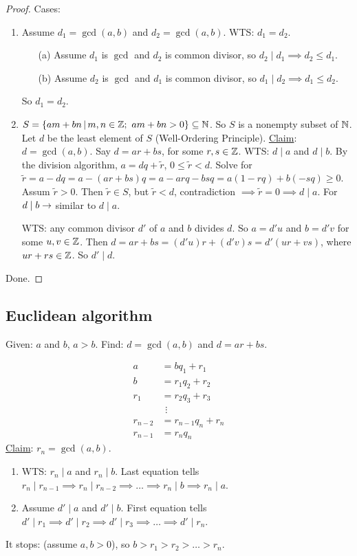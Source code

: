 \documentclass[]{article}
\begin{document}
\begin{proof}
	Cases:
	\begin{enumerate}
		\item Assume $d_1 = \gcd(a,b)$ and $d_2 = \gcd(a,b)$. WTS: $d_1 = d_2$.
		\begin{enumerate}
			\item[(a)] Assume $d_1$ is $\gcd$ and $d_2$ is common divisor, so $d_2\mid d_1 \implies d_2 \leq d_1$.
			\item[(b)] Assume $d_2$ is $\gcd$ and $d_1$ is common divisor, so $d_1\mid d_2 \implies d_1 \leq d_2$.
		\end{enumerate}
		So $d_1 = d_2$.
		
	\item $S = \setm{ am + bn}{m,n\in\mb Z;\ am+bn>0}\subseteq \mb N$. So $S$ is a nonempty subset of $\mathbb{N}$. Let $d$ be the least element of $S$ (Well-Ordering Principle). \ul{Claim}: $d = \gcd(a,b)$. Say $d = ar+bs$, for some $r,s\in\mathbb{Z}$. WTS: $d\mid a$ and $d\mid b$. By the division algorithm, $a = dq + \tilde{r}$, $0\leq \tilde{r}<d$. Solve for $\tilde{r} = a-dq = a-(ar+bs)q = a - arq - bsq = a(1-rq)+b(-sq) \geq 0$. Assum $\tilde r >0$. Then $\tilde r \in S$, but $\tilde r<d$, contradiction $\implies \tilde r = 0 \implies d\mid a$. For $d\mid b \rightarrow$ similar to $d\mid a$.
		
		WTS: any common divisor $d'$ of $a$ and $b$ divides $d$. So $a = d' u$ and $b = d' v$ for some $u,v\in\mathbb{Z}$. Then $d = ar+bs = (d'u)r + (d'v)s = d'(ur + vs)$, where $ur+rs\in\mathbb{Z}$. So $d'\mid d$.
	\end{enumerate}
	Done.
\end{proof}

\subsection{Euclidean algorithm}
Given: $a$ and $b$, $a>b$.
Find: $d = \gcd(a,b)$ and $d = ar+bs$.

\begin{align*}
	a &= bq_1 + r_1 \\
	b &= r_1q_2 + r_2 \\
	r_1 &= r_2q_3 + r_3 \\
	&\ \,\vdots \\
	r_{n-2} &= r_{n-1}q_n + r_n \\
	r_{n-1} &= r_n q_n
\end{align*}
\ul{Claim}: $r_n = \gcd(a,b)$.
\begin{enumerate}
	\item WTS: $r_n\mid a$ and $r_n\mid b$. Last equation tells $r_n\mid r_{n-1} \implies r_n\mid r_{n-2} \implies \dots \implies r_n\mid b \implies r_n\mid a$.
	\item Assume $d'\mid a$ and $d'\mid b$. First equation tells $d'\mid r_1 \implies d'\mid r_2 \implies d'\mid r_3 \implies \dots \implies d'\mid r_n$.
\end{enumerate}
It stops: (assume $a,b>0$), so $b>r_1 > r_2 > \dots > r_n$.
\end{document}
